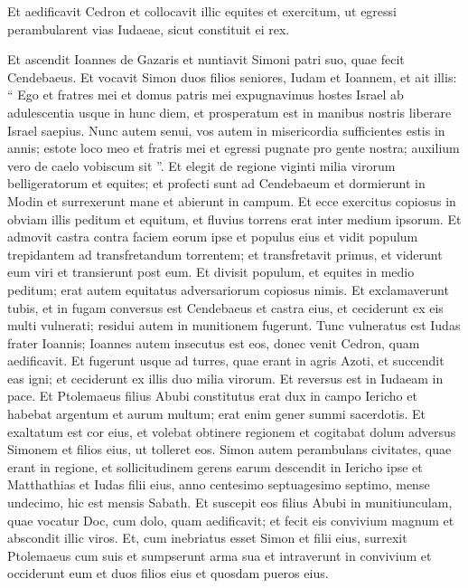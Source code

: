 \begin{biblechapter}
\begin{biblechapter}
\begin{biblechapter}
\begin{biblechapter}
\begin{biblechapter}
\begin{biblechapter}
\begin{biblechapter}
\begin{biblechapter}
\begin{biblechapter}
\begin{biblechapter}
\begin{biblechapter}
\begin{biblechapter}
\begin{biblechapter}
\begin{biblechapter}
\begin{biblechapter}
\verse Et aedificavit Cedron et collocavit illic equites et exercitum, ut egressi perambularent vias Iudaeae, sicut constituit ei rex.
 
\begin{biblechapter}
\verse Et ascendit Ioannes de Gazaris et nuntiavit Simoni patri suo, quae fecit Cendebaeus. 
\verse Et vocavit Simon duos filios seniores, Iudam et Ioannem, et ait illis: “ Ego et fratres mei et domus patris mei expugnavimus hostes Israel ab adulescentia usque in hunc diem, et prosperatum est in manibus nostris liberare Israel saepius. 
\verse Nunc autem senui, vos autem in misericordia sufficientes estis in annis; estote loco meo et fratris mei et egressi pugnate pro gente nostra; auxilium vero de caelo vobiscum sit ”. 
\verse Et elegit de regione viginti milia virorum belligeratorum et equites; et profecti sunt ad Cendebaeum et dormierunt in Modin 
\verse et surrexerunt mane et abierunt in campum. Et ecce exercitus copiosus in obviam illis peditum et equitum, et fluvius torrens erat inter medium ipsorum. 
\verse Et admovit castra contra faciem eorum ipse et populus eius et vidit populum trepidantem ad transfretandum torrentem; et transfretavit primus, et viderunt eum viri et transierunt post eum. 
\verse Et divisit populum, et equites in medio peditum; erat autem equitatus adversariorum copiosus nimis. 
\verse Et exclamaverunt tubis, et in fugam conversus est Cendebaeus et castra eius, et ceciderunt ex eis multi vulnerati; residui autem in munitionem fugerunt. 
\verse Tunc vulneratus est Iudas frater Ioannis; Ioannes autem insecutus est eos, donec venit Cedron, quam aedificavit. 
 \verse Et fugerunt usque ad turres, quae erant in agris Azoti, et succendit eas igni; et ceciderunt ex illis duo milia virorum. Et reversus est in Iudaeam in pace.
 \verse Et Ptolemaeus filius Abubi constitutus erat dux in campo Iericho et habebat argentum et aurum multum; 
\verse erat enim gener summi sacerdotis. 
\verse Et exaltatum est cor eius, et volebat obtinere regionem et cogitabat dolum adversus Simonem et filios eius, ut tolleret eos. 
\verse Simon autem perambulans civitates, quae erant in regione, et sollicitudinem gerens earum descendit in Iericho ipse et Matthathias et Iudas filii eius, anno centesimo septuagesimo septimo, mense undecimo, hic est mensis Sabath. 
\verse Et suscepit eos filius Abubi in munitiunculam, quae vocatur Doc, cum dolo, quam aedificavit; et fecit eis convivium magnum et abscondit illic viros. 
\verse Et, cum inebriatus esset Simon et filii eius, surrexit Ptolemaeus cum suis et sumpserunt arma sua et intraverunt in convivium et occiderunt eum et duos filios eius et quosdam pueros eius. 

\end{biblechapter}
\end{biblechapter}
\end{biblechapter}
\end{biblechapter}
\end{biblechapter}
\end{biblechapter}
\end{biblechapter}
\end{biblechapter}
\end{biblechapter}
\end{biblechapter}
\end{biblechapter}
\end{biblechapter}
\end{biblechapter}
\end{biblechapter}
\end{biblechapter}
\end{biblechapter}
